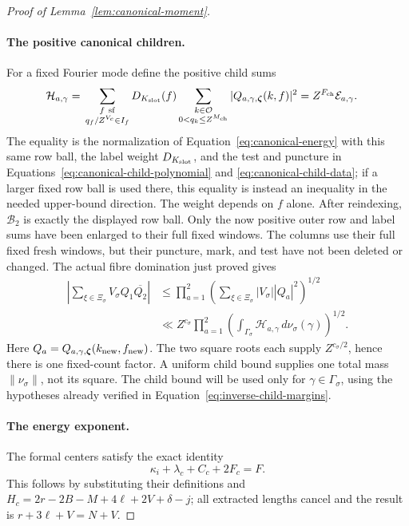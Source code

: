 \documentclass[11pt,a4paper]{article}
\numberwithin{equation}{section}
\numberwithin{figure}{section}
\theoremstyle{definition}
\theoremstyle{remark}
\begin{document}
\begin{proof}[Proof of Lemma~\ref{lem:canonical-moment}]
\paragraph{The positive canonical children.}
For a fixed Fourier mode define the positive child sums
\begin{equation}\label{eq:inverse-positive-child}
 \begin{split}
 \mathcal H_{a,\gamma}={}&
 \sum_{\substack{f\ {\rm sf}\\q_f/Z^{V_c}\in I_f}}
 D_{K_{\rm slot}}(f)
 \sum_{\substack{k\in\mathcal O\\0<q_k\le Z^{M_{\rm ch}}}}
 |Q_{a,\gamma,\boldsymbol\zeta}(k,f)|^2
 =Z^{F_{\rm ch}}\mathcal E_{a,\gamma}.
 \end{split}
\end{equation}
The equality is the normalization of Equation~\eqref{eq:canonical-energy}
with this same row ball, the label weight \(D_{K_{\rm slot}}\), and
the test and puncture in Equations~\eqref{eq:canonical-child-polynomial}
and \eqref{eq:canonical-child-data}; if a larger fixed row ball is
used there, this equality is instead an inequality in the needed
upper-bound direction.  The weight depends on \(f\) alone.
After reindexing, \(\mathcal B_2\) is exactly the displayed row ball.
Only the now positive outer row and label sums have been enlarged to
their full fixed windows.  The columns use their full fixed fresh
windows, but their puncture, mark, and test have not been deleted or
changed.  The actual fibre domination just proved gives
\[
 \begin{split}
 \left|\sum_{\xi\in\Xi_\sigma}V_\sigma Q_1\overline{Q_2}\right|
 &\le\prod_{a=1}^2
       \left(\sum_{\xi\in\Xi_\sigma}|V_\sigma||Q_a|^2\right)^{1/2}\\
 &\ll Z^{c_\sigma}\prod_{a=1}^2
       \left(\int_{\Gamma_\sigma}\mathcal H_{a,\gamma}
                    \,d\nu_\sigma(\gamma)\right)^{1/2}.
 \end{split}
\]
Here \(Q_a=Q_{a,\gamma,\boldsymbol\zeta}(k_{\rm new},f_{\rm new})\).
The two square roots each supply \(Z^{c_\sigma/2}\), hence there is
one fixed-count factor.  A uniform child bound supplies one total
mass \(\|\nu_\sigma\|\), not its square.  The child bound will be
used only for \(\gamma\in\Gamma_\sigma\), using the hypotheses already verified in
Equation~\eqref{eq:inverse-child-margins}.

\paragraph{The energy exponent.}
The formal centers satisfy the exact identity
\begin{equation}\label{eq:canonical-prefactor}
 \kappa_i+\lambda_c+C_c+2F_c=F.
\end{equation}
This follows by substituting their definitions and
\(H_c=2r-2B-M+4\ell+2V+\delta-j\); all extracted lengths cancel and the
result is \(r+3\ell+V=N+V\).


\end{proof}
\end{document}

